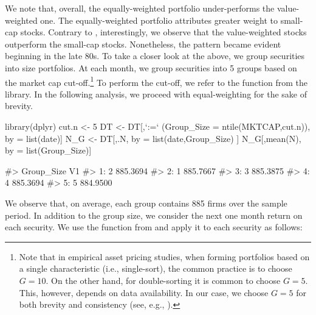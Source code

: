 We note that, overall, the equally-weighted portfolio under-performs the
value-weighted one. The equally-weighted portfolio attributes greater
weight to small-cap stocks. Contrary to \cite{fama1993common}, interestingly, we
observe that the value-weighted stocks outperform the small-cap stocks.
Nonetheless, the pattern became evident beginning in the late
80s. To take a closer look at the above, we group securities into size
portfolios. At each month, we group securities into 5 groups based on
the market cap cut-off.\footnote{\color{black}Note that in empirical asset pricing studies, when forming portfolios based on a single characteristic (i.e., single-sort), the common practice is to choose $G = 10$. On the other hand, for double-sorting it is common to choose $G = 5$. This, however, depends on data availability. In our case, we choose $G = 5$ for both brevity and consistency 
 (see, e.g., \cite{fama1993common}).} To perform the cut-off, we refer to the
 function from the  library. In the
following analysis, we proceed with equal-weighting for the sake of
brevity.
\begin{Schunk}
\begin{Sinput}
library(dplyr)
cut.n <- 5
DT <- DT[,`:=` (Group_Size = ntile(MKTCAP,cut.n)), by = list(date)]
N_G <- DT[,.N, by = list(date,Group_Size) ]
N_G[,mean(N), by = list(Group_Size)]
\end{Sinput}
\begin{Soutput}
#>    Group_Size       V1
#> 1:          2 885.3694
#> 2:          1 885.7667
#> 3:          3 885.3875
#> 4:          4 885.3694
#> 5:          5 884.9500
\end{Soutput}
\end{Schunk}

We observe that, on average, each group contains 885 firms over the
sample period. In addition to the group size, we consider the next one
month return on each security. We use the  function from
 and apply it to each security as follows:

